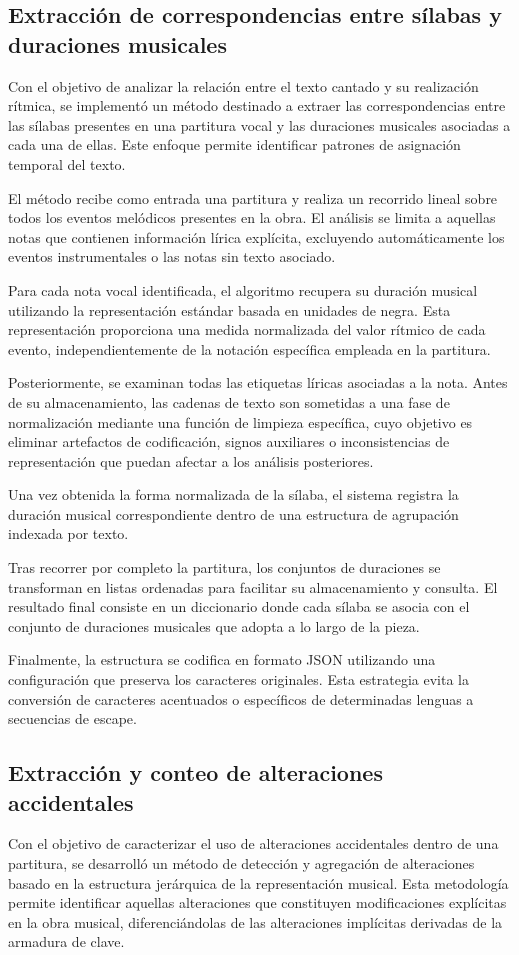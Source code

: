 \subsection{Extracción de correspondencias entre sílabas y duraciones musicales}
Con el objetivo de analizar la relación entre el texto cantado y su realización rítmica, se implementó un método destinado a extraer las correspondencias entre las sílabas presentes en una partitura vocal y las duraciones musicales asociadas a cada una de ellas. Este enfoque permite identificar patrones de asignación temporal del texto.

El método recibe como entrada una partitura y realiza un recorrido lineal sobre todos los eventos melódicos presentes en la obra. El análisis se limita a aquellas notas que contienen información lírica explícita, excluyendo automáticamente los eventos instrumentales o las notas sin texto asociado.

Para cada nota vocal identificada, el algoritmo recupera su duración musical utilizando la representación estándar basada en unidades de negra. Esta representación proporciona una medida normalizada del valor rítmico de cada evento, independientemente de la notación específica empleada en la partitura.

Posteriormente, se examinan todas las etiquetas líricas asociadas a la nota. Antes de su almacenamiento, las cadenas de texto son sometidas a una fase de normalización mediante una función de limpieza específica, cuyo objetivo es eliminar artefactos de codificación, signos auxiliares o inconsistencias de representación que puedan afectar a los análisis posteriores.

Una vez obtenida la forma normalizada de la sílaba, el sistema registra la duración musical correspondiente dentro de una estructura de agrupación indexada por texto.

Tras recorrer por completo la partitura, los conjuntos de duraciones se transforman en listas ordenadas para facilitar su almacenamiento y consulta. El resultado final consiste en un diccionario donde cada sílaba se asocia con el conjunto de duraciones musicales que adopta a lo largo de la pieza.

Finalmente, la estructura se codifica en formato JSON utilizando una configuración que preserva los caracteres originales. Esta estrategia evita la conversión de caracteres acentuados o específicos de determinadas lenguas a secuencias de escape.

\subsection{Extracción y conteo de alteraciones accidentales}
Con el objetivo de caracterizar el uso de alteraciones accidentales dentro de una partitura, se desarrolló un método de detección y agregación de alteraciones basado en la estructura jerárquica de la representación musical. Esta metodología permite identificar aquellas alteraciones que constituyen modificaciones explícitas en la obra musical, diferenciándolas de las alteraciones implícitas derivadas de la armadura de clave.

